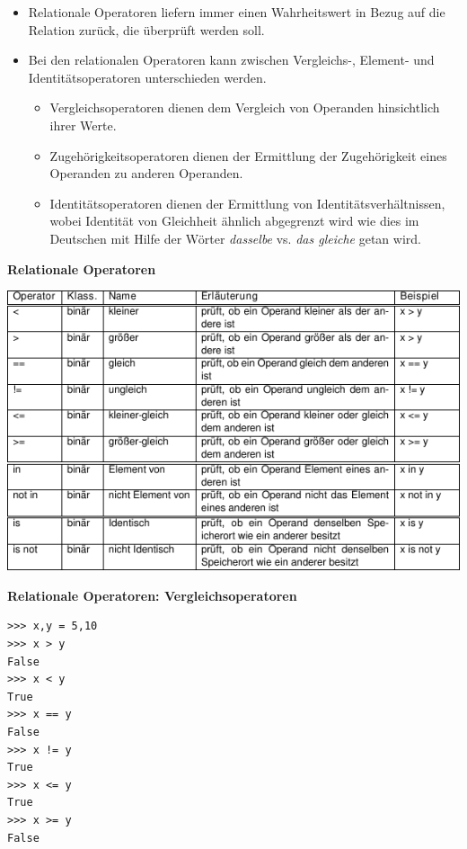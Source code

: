 \begin{itemize}
\itemsep1pt\parskip0pt
\item
  {Relationale Operatoren liefern immer einen Wahrheitswert in Bezug auf
  die Relation zurück, die überprüft werden soll.}
\item
  {Bei den relationalen Operatoren kann zwischen Vergleichs-, Element-
  und Identitätsoperatoren unterschieden werden.}

  \begin{itemize}
  \itemsep1pt\parskip0pt
  \item
    {Vergleichsoperatoren dienen dem Vergleich von Operanden
    hinsichtlich ihrer Werte.}
  \item
    {Zugehörigkeitsoperatoren dienen der Ermittlung der Zugehörigkeit
    eines Operanden zu anderen Operanden.}
  \item
    {Identitätsoperatoren dienen der Ermittlung von
    Identitätsverhältnissen, wobei Identität von Gleichheit ähnlich
    abgegrenzt wird wie dies im Deutschen mit Hilfe der Wörter
    \emph{dasselbe} vs. \emph{das gleiche} getan wird.}
  \end{itemize}
\end{itemize}




\par\noindent\textbf{Relationale Operatoren}

\includegraphics[width=\textwidth]{img/relationale_operatoren.pdf}




\par\noindent\textbf{Relationale Operatoren: Vergleichsoperatoren}

\begin{verbatim}
>>> x,y = 5,10
>>> x > y
False
>>> x < y
True
>>> x == y
False
>>> x != y
True
>>> x <= y
True
>>> x >= y
False
\end{verbatim}




